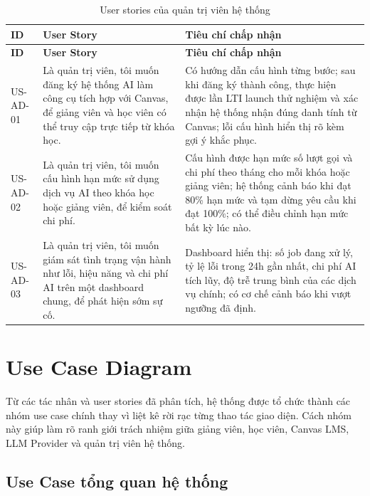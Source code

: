 \begingroup
\scriptsize
\setlength{\tabcolsep}{3pt}
\begin{longtable}{|p{1.6cm}|p{5.6cm}|p{7cm}|}
\caption{User stories của quản trị viên hệ thống}
\label{tab:user-stories-admin}\\
\hline
\textbf{ID} & \textbf{User Story} & \textbf{Tiêu chí chấp nhận} \\
\hline
\endfirsthead
\hline
\textbf{ID} & \textbf{User Story} & \textbf{Tiêu chí chấp nhận} \\
\hline
\endhead
US-AD-01 & Là quản trị viên, tôi muốn đăng ký hệ thống AI làm công cụ tích hợp với Canvas, để giảng viên và học viên có thể truy cập trực tiếp từ khóa học. & Có hướng dẫn cấu hình từng bước; sau khi đăng ký thành công, thực hiện được lần LTI launch thử nghiệm và xác nhận hệ thống nhận đúng danh tính từ Canvas; lỗi cấu hình hiển thị rõ kèm gợi ý khắc phục. \\
\hline
US-AD-02 & Là quản trị viên, tôi muốn cấu hình hạn mức sử dụng dịch vụ AI theo khóa học hoặc giảng viên, để kiểm soát chi phí. & Cấu hình được hạn mức số lượt gọi và chi phí theo tháng cho mỗi khóa hoặc giảng viên; hệ thống cảnh báo khi đạt 80\% hạn mức và tạm dừng yêu cầu khi đạt 100\%; có thể điều chỉnh hạn mức bất kỳ lúc nào. \\
\hline
US-AD-03 & Là quản trị viên, tôi muốn giám sát tình trạng vận hành như lỗi, hiệu năng và chi phí AI trên một dashboard chung, để phát hiện sớm sự cố. & Dashboard hiển thị: số job đang xử lý, tỷ lệ lỗi trong 24h gần nhất, chi phí AI tích lũy, độ trễ trung bình của các dịch vụ chính; có cơ chế cảnh báo khi vượt ngưỡng đã định. \\
\hline
\end{longtable}
\endgroup

\section{Use Case Diagram}
\label{sec:use-case-diagram}

Từ các tác nhân và user stories đã phân tích, hệ thống được tổ chức thành các
nhóm use case chính thay vì liệt kê rời rạc từng thao tác giao diện. Cách nhóm
này giúp làm rõ ranh giới trách nhiệm giữa giảng viên, học viên, Canvas LMS,
LLM Provider và quản trị viên hệ thống.

\subsection{Use Case tổng quan hệ thống}
\label{subsec:use-case-tong-quan}

